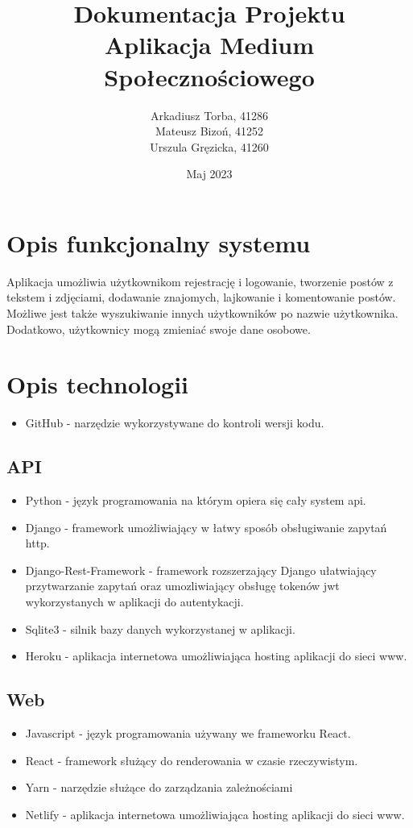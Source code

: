 \documentclass{article}
\title{Dokumentacja Projektu \\
Aplikacja Medium Społecznościowego}
\author{Arkadiusz Torba, 41286\\
Mateusz Bizoń, 41252\\
Urszula Gręzicka, 41260}
\date{Maj 2023}
\begin{document}
\maketitle


\section{Opis funkcjonalny systemu}
Aplikacja umożliwia użytkownikom rejestrację i logowanie, tworzenie postów z tekstem i zdjęciami, dodawanie znajomych, lajkowanie i komentowanie postów. Możliwe jest także wyszukiwanie innych użytkowników po nazwie użytkownika. Dodatkowo, użytkownicy mogą zmieniać swoje dane osobowe.
\section{Opis technologii}
\begin{itemize}
    \item GitHub - narzędzie wykorzystywane do kontroli wersji kodu.
\end{itemize}
\subsection{API}
\begin{itemize}
    \item Python - język programowania na którym opiera się cały system api.
    \item Django - framework umożliwiający w łatwy sposób obsługiwanie zapytań http.
    \item Django-Rest-Framework - framework rozszerzający Django ułatwiający przytwarzanie zapytań oraz umozliwiający obsługę tokenów jwt wykorzystanych w aplikacji do autentykacji.
    \item Sqlite3 - silnik bazy danych wykorzystanej w aplikacji.
    \item Heroku - aplikacja internetowa umożliwiająca hosting aplikacji do sieci www.
\end{itemize}
\subsection{Web}
\begin{itemize}
    \item Javascript - język programowania używany we frameworku React.
    \item React - framework służący do renderowania w czasie rzeczywistym.
    \item Yarn - narzędzie służące do zarządzania zależnościami
    \item Netlify - aplikacja internetowa umożliwiająca hosting aplikacji do sieci www.
\end{itemize}
\end{document}

